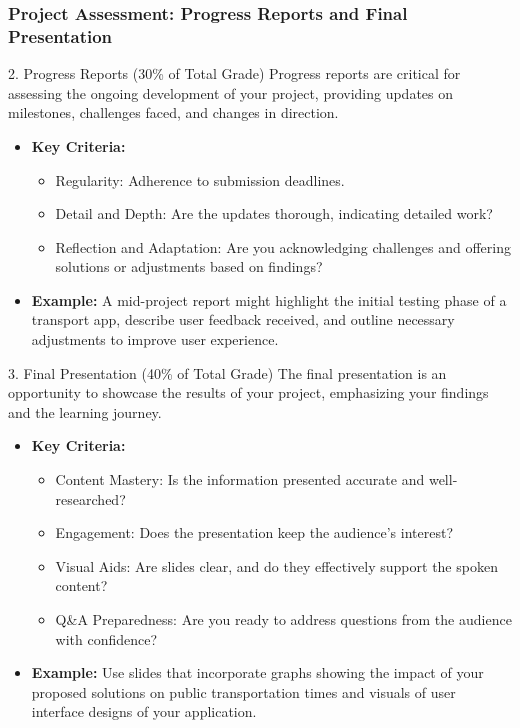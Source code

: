 \documentclass[aspectratio=169]{beamer}
\begin{document}
\begin{frame}[fragile]
    \frametitle{Project Assessment: Progress Reports and Final Presentation}
    \begin{block}{2. Progress Reports (30\% of Total Grade)}
        Progress reports are critical for assessing the ongoing development of your project, providing updates on milestones, challenges faced, and changes in direction.
    \end{block}
    \begin{itemize}
        \item \textbf{Key Criteria:}
            \begin{itemize}
                \item Regularity: Adherence to submission deadlines.
                \item Detail and Depth: Are the updates thorough, indicating detailed work?
                \item Reflection and Adaptation: Are you acknowledging challenges and offering solutions or adjustments based on findings?
            \end{itemize}
        \item \textbf{Example:} A mid-project report might highlight the initial testing phase of a transport app, describe user feedback received, and outline necessary adjustments to improve user experience.
    \end{itemize}
    
    \begin{block}{3. Final Presentation (40\% of Total Grade)}
        The final presentation is an opportunity to showcase the results of your project, emphasizing your findings and the learning journey.
    \end{block}
    \begin{itemize}
        \item \textbf{Key Criteria:}
            \begin{itemize}
                \item Content Mastery: Is the information presented accurate and well-researched?
                \item Engagement: Does the presentation keep the audience's interest?
                \item Visual Aids: Are slides clear, and do they effectively support the spoken content?
                \item Q\&A Preparedness: Are you ready to address questions from the audience with confidence?
            \end{itemize}
        \item \textbf{Example:} Use slides that incorporate graphs showing the impact of your proposed solutions on public transportation times and visuals of user interface designs of your application.
    \end{itemize}
\end{frame}
\end{document}
